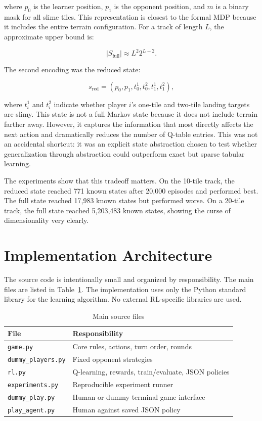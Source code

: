 \documentclass[conference]{IEEEtran}
\begin{document}
where $p_0$ is the learner position, $p_1$ is the opponent position, and $m$ is a
binary mask for all slime tiles. This representation is closest to the formal MDP
because it includes the entire terrain configuration. For a track of length $L$,
the approximate upper bound is:

\begin{equation}
|S_{\text{full}}| \approx L^2 2^{L-2}.
\end{equation}

The second encoding was the reduced state:

\begin{equation}
s_{\text{red}} =
(p_0, p_1, t_0^1, t_0^2, t_1^1, t_1^2),
\end{equation}

where $t_i^1$ and $t_i^2$ indicate whether player $i$'s one-tile and two-tile
landing targets are slimy. This state is not a full Markov state because it does
not include terrain farther away. However, it captures the information that most
directly affects the next action and dramatically reduces the number of Q-table
entries. This was not an accidental shortcut: it was an explicit state abstraction
chosen to test whether generalization through abstraction could outperform exact
but sparse tabular learning.

The experiments show that this tradeoff matters. On the 10-tile track, the reduced
state reached 771 known states after 20,000 episodes and performed best. The full
state reached 17,983 known states but performed worse. On a 20-tile track, the
full state reached 5,203,483 known states, showing the curse of dimensionality very
clearly.

\section{Implementation Architecture}

The source code is intentionally small and organized by responsibility. The main
files are listed in Table~\ref{tab:files}. The implementation uses only the Python
standard library for the learning algorithm. No external RL-specific libraries are
used.

\begin{table}[h]
\centering
\caption{Main source files}
\label{tab:files}
\begin{tabular}{ll}
\toprule
File & Responsibility \\
\midrule
\texttt{game.py} & Core rules, actions, turn order, rounds \\
\texttt{dummy\_players.py} & Fixed opponent strategies \\
\texttt{rl.py} & Q-learning, rewards, train/evaluate, JSON policies \\
\texttt{experiments.py} & Reproducible experiment runner \\
\texttt{dummy\_play.py} & Human or dummy terminal game interface \\
\texttt{play\_agent.py} & Human against saved JSON policy \\
\bottomrule
\end{tabular}
\end{table}
\end{document}
